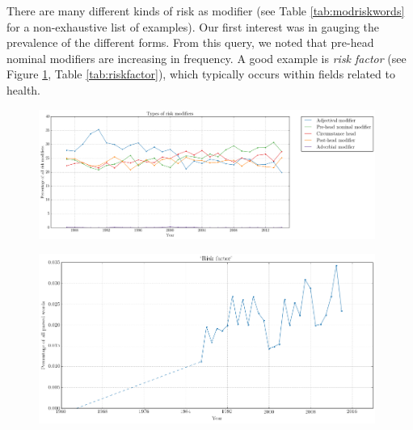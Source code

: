 There are many different kinds of risk as modifier (see Table \ref{tab:modriskwords} for a non-exhaustive list of examples). Our first interest was in gauging the prevalence of the different forms. From this query, we noted that pre-head nominal modifiers are increasing in frequency. A good example is \emph{risk factor} (see Figure \ref{fig:riskfactor}, Table \ref{tab:riskfactor}), which typically occurs within fields related to health.

\noindent
\begin{figure}[htb!]
\centering
\begin{minipage}{.567\textwidth}
\centering
\includegraphics[width=0.98\textwidth]{../images/old-types-of-risk-modifiers.png}
\label{fig:riskmod_types}
\end{minipage}%
\begin{minipage}{.433\textwidth}
\centering
\includegraphics[width=0.98\textwidth]{../images/risk-factor.png}
\label{fig:riskfactor}
\end{minipage}
\end{figure}

